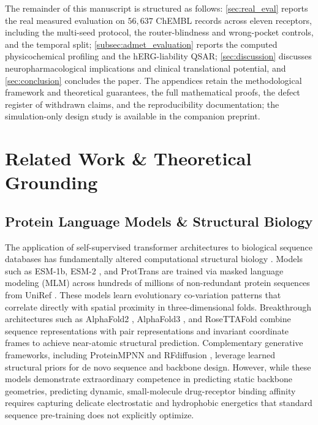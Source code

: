 \documentclass{article}
\theoremstyle{definition}
\begin{document}
The remainder of this manuscript is structured as follows: \cref{sec:real_eval} reports the real measured evaluation on $56{,}637$ ChEMBL records across eleven receptors, including the multi-seed protocol, the router-blindness and wrong-pocket controls, and the temporal split; \cref{subsec:admet_evaluation} reports the computed physicochemical profiling and the hERG-liability QSAR; \cref{sec:discussion} discusses neuropharmacological implications and clinical translational potential, and \cref{sec:conclusion} concludes the paper. The appendices retain the methodological framework and theoretical guarantees, the full mathematical proofs, the defect register of withdrawn claims, and the reproducibility documentation; the simulation-only design study is available in the companion preprint.

\section{Related Work \& Theoretical Grounding}
\label{sec:related_work}

\subsection{Protein Language Models \& Structural Biology}
The application of self-supervised transformer architectures to biological sequence databases has fundamentally altered computational structural biology \citep{vaswani2017attention,rives2021biological}. Models such as ESM-1b, ESM-2 \citep{lin2023evolutionary}, and ProtTrans \citep{elnaggar2021prottrans} are trained via masked language modeling (MLM) across hundreds of millions of non-redundant protein sequences from UniRef \citep{uniprot2023uniprot}. These models learn evolutionary co-variation patterns that correlate directly with spatial proximity in three-dimensional folds. Breakthrough architectures such as AlphaFold2 \citep{jumper2021highly}, AlphaFold3 \citep{abramson2024accurate}, and RoseTTAFold \citep{baek2021accurate} combine sequence representations with pair representations and invariant coordinate frames to achieve near-atomic structural prediction. Complementary generative frameworks, including ProteinMPNN \citep{dauparas2022robust} and RFdiffusion \citep{watson2023novo}, leverage learned structural priors for de novo sequence and backbone design. However, while these models demonstrate extraordinary competence in predicting static backbone geometries, predicting dynamic, small-molecule drug-receptor binding affinity requires capturing delicate electrostatic and hydrophobic energetics that standard sequence pre-training does not explicitly optimize.
\end{document}
